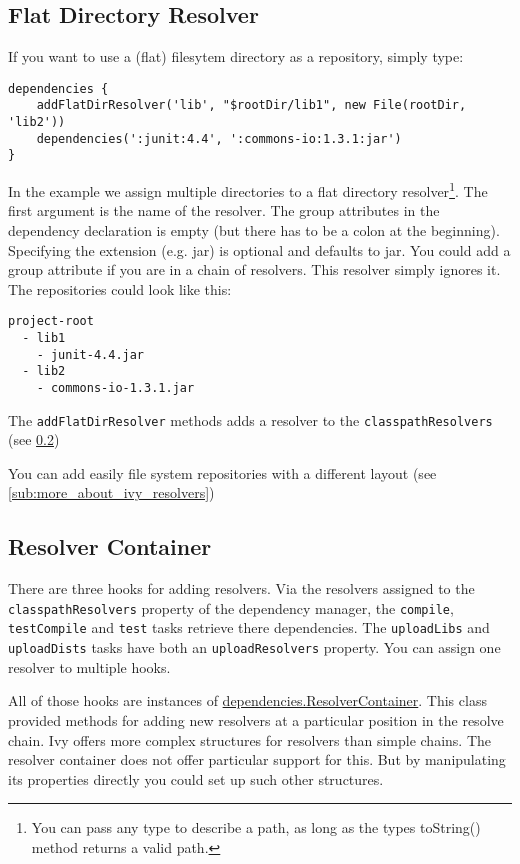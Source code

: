 \subsection{Flat Directory Resolver} %
\label{sub:flat_dir_resolver}
If you want to use a (flat) filesytem directory as a repository, simply type:
\begin{Verbatim}
dependencies {
	addFlatDirResolver('lib', "$rootDir/lib1", new File(rootDir, 'lib2'))
	dependencies(':junit:4.4', ':commons-io:1.3.1:jar')
}
\end{Verbatim}
In the example we assign multiple directories to a flat directory resolver\footnote{You can pass any type to describe a path, as long as the types toString() method returns a valid path.}. The first argument is the name of the resolver. The group attributes in the dependency declaration is empty (but there has to be a colon at the beginning). Specifying the extension (e.g. jar) is optional and defaults to jar. You could add a group attribute if you are in a chain of resolvers. This resolver simply ignores it. The repositories could look like this:
\begin{Verbatim}
project-root
  - lib1
    - junit-4.4.jar
  - lib2
    - commons-io-1.3.1.jar
\end{Verbatim}
The \texttt{addFlatDirResolver} methods adds a resolver to the \texttt{classpathResolvers} (see  \ref{sub:resolver_container})

You can add easily file system repositories with a different layout (see \ref{sub:more_about_ivy_resolvers})

\subsection{Resolver Container} %
\label{sub:resolver_container}
There are three hooks for adding resolvers. Via the resolvers assigned to the \texttt{classpathResolvers} property of the dependency manager, the \texttt{compile}, \texttt{testCompile} and \texttt{test} tasks retrieve there dependencies. The \texttt{uploadLibs} and \texttt{uploadDists} tasks have both an \texttt{uploadResolvers} property. You can assign one resolver to multiple hooks.

All of those hooks are instances of \href{\API dependencies/ResolverContainer.html}{\PKG dependencies.ResolverContainer}. This class provided methods for adding new resolvers at a particular position in the resolve chain. Ivy offers more complex structures for resolvers than simple chains. The resolver container does not offer particular support for this. But by manipulating its properties directly you could set up such other structures.

